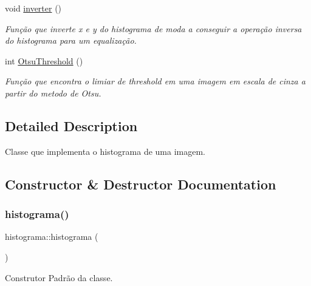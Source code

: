 \begin{DoxyCompactItemize}
void \mbox{\hyperlink{classhistograma_a46f65a2b34dc9f966974127cf338dfda}{inverter}} ()
\begin{DoxyCompactList}\small\item\em Função que inverte x e y do histograma de moda a conseguir a operação inversa do histograma para um equalização. \end{DoxyCompactList}\item 
int \mbox{\hyperlink{classhistograma_a218f742ad471f85a5ce049c55a92e2e6}{Otsu\+Threshold}} ()
\begin{DoxyCompactList}\small\item\em Função que encontra o limiar de threshold em uma imagem em escala de cinza a partir do metodo de Otsu. \end{DoxyCompactList}\end{DoxyCompactItemize}


\subsection{Detailed Description}
Classe que implementa o histograma de uma imagem. 



\subsection{Constructor \& Destructor Documentation}
\mbox{\label{classhistograma_a65a071a25a8ac26d267bcee83ffe5780}} 
\subsubsection{\texorpdfstring{histograma()}{histograma()}\hspace{0.1cm}{\footnotesize\ttfamily [1/2]}}
{\footnotesize\ttfamily histograma\+::histograma (\begin{DoxyParamCaption}{ }\end{DoxyParamCaption})\hspace{0.3cm}{\ttfamily [inline]}}



Construtor Padrão da classe. 

\mbox{\label{classhistograma_a09adc8454f5839fc87b6e578d122897f}} 
